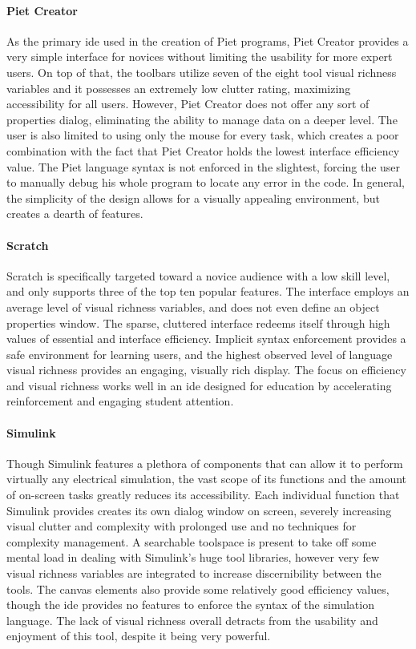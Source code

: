 \paragraph{Piet Creator} As the primary \ac{ide} used in the creation of
Piet programs, Piet Creator provides a very simple
interface for novices without limiting the usability for more expert users.
On top of that, the toolbars utilize seven of the eight tool visual
richness variables and it possesses an extremely low clutter rating,
maximizing accessibility for all users.  However, Piet Creator does not
offer any sort of properties dialog, eliminating the ability to manage data
on a deeper level. The user is also limited to using only the mouse for
every task, which creates a poor combination with the fact that Piet
Creator holds the lowest interface efficiency value. The Piet language
syntax is not enforced in the slightest, forcing the user to manually debug
his whole program to locate any error in the code. In general, the
simplicity of the design allows for a visually
appealing environment, but creates a dearth of features.

\paragraph{Scratch} Scratch is
specifically targeted toward a novice audience with a low skill level, and
only supports three of the top ten popular features. The interface employs
an average level of visual richness variables, and does not even define an
object properties window. The sparse, cluttered interface redeems itself
through high values of essential and interface efficiency. Implicit syntax
enforcement provides a safe environment for learning users, and the highest
observed level of language visual richness provides an engaging, visually
rich display. The focus on efficiency and visual richness works well in an
\ac{ide} designed for education by accelerating reinforcement and engaging
student attention.

\paragraph{Simulink} Though Simulink features a plethora of components that
can allow it to perform virtually any electrical simulation, the vast scope
of its functions and the amount of on-screen tasks greatly reduces its
accessibility. Each individual function that Simulink provides creates its
own dialog window on screen, severely increasing visual clutter and
complexity with prolonged use and no techniques for complexity management.
A searchable toolspace is present to take off some mental load in dealing
with Simulink's huge tool libraries, however very few visual richness
variables are integrated to increase discernibility between the tools. The
canvas elements also provide some relatively good efficiency values, though
the \ac{ide} provides no features to enforce the syntax of the simulation
language. The lack of visual richness overall detracts from the usability
and enjoyment of this tool, despite it being very powerful.

